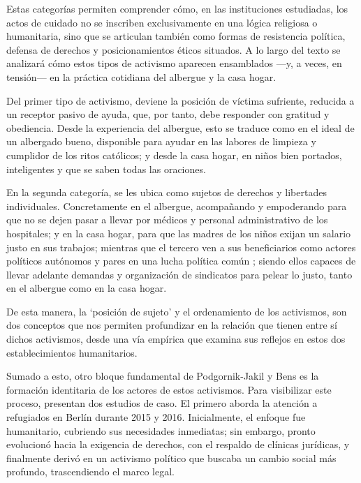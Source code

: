 \documentclass[
  spanish,
  11pt,
  a4paper,
]{scrbook}
\begin{document}
Estas categorías permiten comprender cómo, en las instituciones
estudiadas, los actos de cuidado no se inscriben exclusivamente en una
lógica religiosa o humanitaria, sino que se articulan también como
formas de resistencia política, defensa de derechos y posicionamientos
éticos situados. A lo largo del texto se analizará cómo estos tipos de
activismo aparecen ensamblados ---y, a veces, en tensión--- en la
práctica cotidiana del albergue y la casa hogar.

Del primer tipo de activismo, deviene la posición de víctima sufriente,
reducida a un receptor pasivo de ayuda, que, por tanto, debe responder
con gratitud y obediencia. Desde la experiencia del albergue, esto se
traduce como en el ideal de un albergado bueno, disponible para ayudar
en las labores de limpieza y cumplidor de los ritos católicos; y desde
la casa hogar, en niños bien portados, inteligentes y que se saben todas
las oraciones.

En la segunda categoría, se les ubica como sujetos de derechos y
libertades individuales. Concretamente en el albergue, acompañando y
empoderando para que no se dejen pasar a llevar por médicos y personal
administrativo de los hospitales; y en la casa hogar, para que las
madres de los niños exijan un salario justo en sus trabajos; mientras
que el tercero ven a sus beneficiarios como actores políticos autónomos
y pares en una lucha política común \autocite[301]{PodgornikJakil2021};
siendo ellos capaces de llevar adelante demandas y organización de
sindicatos para pelear lo justo, tanto en el albergue como en la casa
hogar.

De esta manera, la `posición de sujeto' y el ordenamiento de los
activismos, son dos conceptos que nos permiten profundizar en la
relación que tienen entre sí dichos activismos, desde una vía empírica
que examina sus reflejos en estos dos establecimientos humanitarios.

Sumado a esto, otro bloque fundamental de Podgornik-Jakil y Bens es la
formación identitaria de los actores de estos activismos. Para
visibilizar este proceso, presentan dos estudios de caso. El primero
aborda la atención a refugiados en Berlín durante 2015 y 2016.
Inicialmente, el enfoque fue humanitario, cubriendo sus necesidades
inmediatas; sin embargo, pronto evolucionó hacia la exigencia de
derechos, con el respaldo de clínicas jurídicas, y finalmente derivó en
un activismo político que buscaba un cambio social más profundo,
trascendiendo el marco legal.
\end{document}
